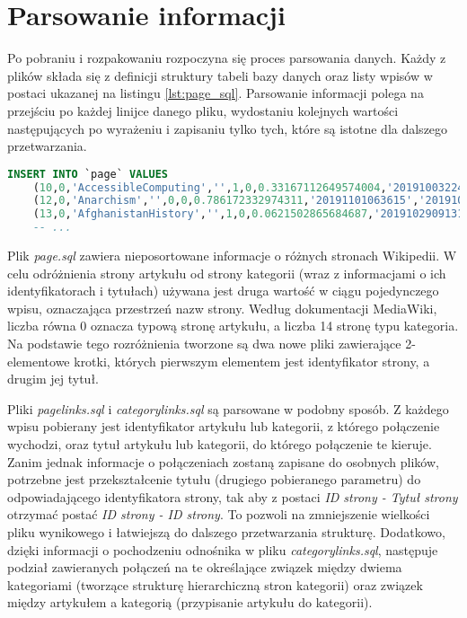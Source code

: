 \section{Parsowanie informacji}
\label{sec:data-parsing}
Po pobraniu i rozpakowaniu rozpoczyna się proces parsowania danych. Każdy z plików  składa się z definicji struktury tabeli bazy danych oraz listy wpisów w postaci ukazanej na listingu \ref{lst:page_sql}. Parsowanie informacji polega na przejściu po każdej linijce danego pliku, wydostaniu kolejnych wartości następujących po wyrażeniu  i zapisaniu tylko tych, które są istotne dla dalszego przetwarzania.

\begin{lstlisting}[language=SQL,frame=single,caption={Fragment pliku enwiki-20191101-page.sql zawierający dane o stronach},label=lst:page_sql]
INSERT INTO `page` VALUES
    (10,0,'AccessibleComputing','',1,0,0.33167112649574004,'20191003224230','20190105021557',854851586,94,'wikitext',NULL),
    (12,0,'Anarchism','',0,0,0.786172332974311,'20191101063615','20191031183024',923631615,104479,'wikitext',NULL),
    (13,0,'AfghanistanHistory','',1,0,0.0621502865684687,'20191029091312','20190618192734',783865149,90,'wikitext',NULL),
    -- ...
\end{lstlisting}

Plik \textit{page.sql} zawiera nieposortowane informacje o różnych stronach Wikipedii. W celu odróżnienia strony artykułu od strony kategorii (wraz z informacjami o ich identyfikatorach i tytułach) używana jest druga wartość w ciągu pojedynczego wpisu, oznaczająca przestrzeń nazw strony. Według dokumentacji MediaWiki, liczba równa 0 oznacza typową stronę artykułu, a liczba 14 stronę typu kategoria. Na podstawie tego rozróżnienia tworzone są dwa nowe pliki zawierające 2-elementowe krotki, których pierwszym elementem jest identyfikator strony, a drugim jej tytuł.

Pliki \textit{pagelinks.sql} i \textit{categorylinks.sql} są parsowane w podobny sposób. Z każdego wpisu pobierany jest identyfikator artykułu lub kategorii, z którego połączenie wychodzi, oraz tytuł artykułu lub kategorii, do którego połączenie te kieruje. Zanim jednak informacje o połączeniach zostaną zapisane do osobnych plików, potrzebne jest przekształcenie tytułu (drugiego pobieranego parametru) do odpowiadającego identyfikatora strony, tak aby z postaci \textit{ID strony - Tytuł strony} otrzymać postać \textit{ID strony - ID strony}. To pozwoli na zmniejszenie wielkości pliku wynikowego i łatwiejszą do dalszego przetwarzania strukturę. Dodatkowo, dzięki informacji o pochodzeniu odnośnika w pliku \textit{categorylinks.sql}, następuje podział zawieranych połączeń na te określające związek między dwiema kategoriami (tworzące strukturę hierarchiczną stron kategorii) oraz związek między artykułem a kategorią (przypisanie artykułu do kategorii).

